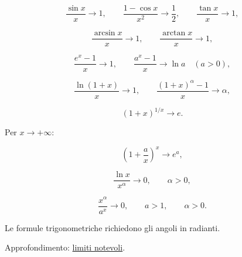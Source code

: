 \[
\frac{\sin x}{x}\to1,
\qquad
\frac{1-\cos x}{x^2}\to\frac12,
\qquad
\frac{\tan x}{x}\to1,
\]

\[
\frac{\arcsin x}{x}\to1,
\qquad
\frac{\arctan x}{x}\to1,
\]

\[
\frac{e^x-1}{x}\to1,
\qquad
\frac{a^x-1}{x}\to\ln a
\quad(a>0),
\]

\[
\frac{\ln(1+x)}{x}\to1,
\qquad
\frac{(1+x)^\alpha-1}{x}\to\alpha,
\]

\[
(1+x)^{1/x}\to e.
\]

Per \(x\to+\infty\):

\[
\left(1+\frac ax\right)^x\to e^a,
\]

\[
\frac{\ln x}{x^\alpha}\to0,
\qquad \alpha>0,
\]

\[
\frac{x^\alpha}{a^x}\to0,
\qquad a>1,
\qquad \alpha>0.
\]

Le formule trigonometriche richiedono gli angoli in radianti.

Approfondimento: \href{https://ingegnerismo.it/matematica/limiti-notevoli/}{limiti notevoli}.
